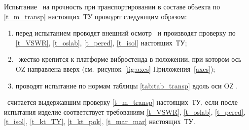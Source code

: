 Испытание \dut \ на прочность при транспортировании в составе объекта по \ref{t_m_transp} настоящих~ТУ проводят следующим образом:
%
\begin{enumerate}
	\item перед испытанием проводят внешний осмотр \dut \ и производят проверку по \ref{t_VSWR}, \ref{t_oslab}, \ref{t_pered}, \ref{t_isol} настоящих~ТУ;
	\item \dut \ жестко крепится к платформе вибростенда в положении, при котором ось OZ направлена вверх (см.~рисунок~\ref{fig:axes} Приложения~\ref{axes});
	\item проводят испытание по нормам таблицы \ref{tab:tab_transp} вдоль оси OZ .
\end{enumerate}

\dut \ считается выдержавшим проверку  \ref{t_m_transp} настоящих~ТУ, если после испытания изделие соответствует требованиям \ref{t_VSWR}, \ref{t_oslab}, \ref{t_pered}, \ref{t_isol}, \ref{t_kt_TY}, \ref{t_kt_pok}, \ref{t_mar_mar} настоящих~ТУ.